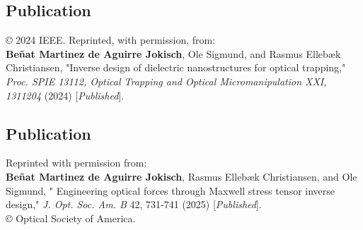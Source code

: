 \vspace*{0.4\textheight}
\begin{center}
  \begin{minipage}{0.9\linewidth}
    \section*{Publication \cite{ownpub3}}

    © 2024 IEEE. Reprinted, with permission, from: \\


    \textbf{Beñat Martinez de Aguirre Jokisch}, Ole Sigmund, and Rasmus Ellebæk Christiansen, "Inverse design of dielectric nanostructures for optical trapping," \textit{Proc. SPIE 13112, Optical Trapping and Optical Micromanipulation XXI, 1311204} (2024) [\textit{Published}].
  \end{minipage}
\end{center}
\newpage


\vspace*{0.4\textheight}
\begin{center}
  \begin{minipage}{0.9\linewidth}
    \section*{Publication \cite{ownpub2}}
    Reprinted with permission from:\\ 

    \textbf{Beñat Martinez de Aguirre Jokisch}, Rasmus Ellebæk Christiansen, and Ole Sigmund, "
    Engineering optical forces through Maxwell stress tensor inverse design,"  \textit{J. Opt. Soc. Am. B} 42, 731-741 (2025) [\textit{Published}].\\

    © Optical Society of America.

  \end{minipage}
\end{center}
\newpage


